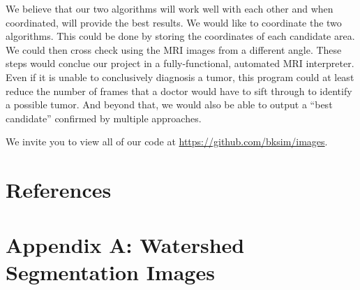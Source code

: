 \documentclass[12pt]{article}
\theoremstyle{plain}%
\theoremstyle{definition}
\theoremstyle{remark}
\begin{document}
We believe that our two algorithms will work well with each other and when coordinated, will provide the best results.  We would like to coordinate the two algorithms.  This could be done by storing the coordinates of each candidate area.  We could then cross check using the MRI images from a different angle.  These steps would conclue our project in a fully-functional, automated MRI interpreter.  Even if it is unable to conclusively diagnosis a tumor, this program could at least reduce the number of frames that a doctor would have to sift through to identify a possible tumor.  And beyond that, we would also be able to output a “best candidate” confirmed by multiple approaches.

We invite you to view all of our code at \url{https://github.com/bksim/images}.
\section{References}
	
\section{Appendix A: Watershed Segmentation Images}
\end{document}
